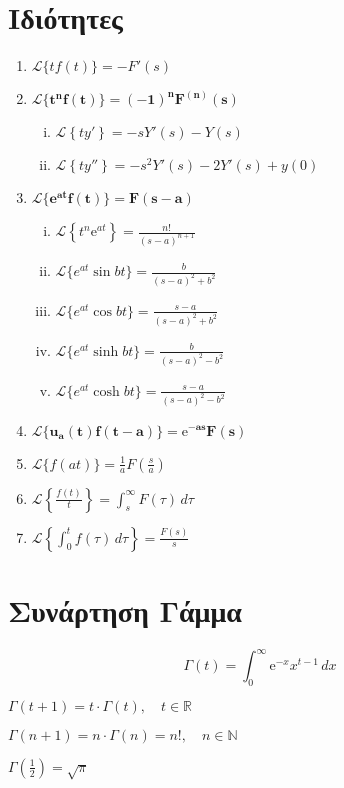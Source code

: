 {  \section*{Ιδιότητες}
  \begin{enumerate}
    \item $ \mathcal{L}\{tf(t)\} = -F'(s) $
    \item $ \bm{\mathcal{L}\{t^{n}f(t)\} = (-1)^{n} F^{(n)}(s)} $
      \begin{enumerate}[i)]
        \item $ \mathcal{L}\left\{ty'\right\} = -sY'(s)-Y(s) $ 
        \item $ \mathcal{L}\left\{ty''\right\} = -s^{2}Y'(s)-2Y'(s)+y(0) $ 
      \end{enumerate}
    \item $ \bm{\mathcal{L}\{e^{at}f(t)\} = F(s-a)}$
      \begin{enumerate}[i)]
        \item $ \mathcal{L}\left\{t^{n} \mathrm{e}^{at}\right\}=\frac{n!}{(s-a)^{n+1}} $
        \item $ \mathcal{L}\{e^{at} \sin{bt}\} = \frac{b}{(s-a)^{2}+b^{2}}$
        \item $ \mathcal{L}\{e^{at} \cos{bt}\} = \frac{s-a}{(s-a)^{2}+b^{2}}$
        \item $ \mathcal{L}\{e^{at} \sinh{bt}\} = \frac{b}{(s-a)^{2}-b^{2}}$
        \item $ \mathcal{L}\{e^{at} \cosh{bt}\} = \frac{s-a}{(s-a)^{2}-b^{2}}$
      \end{enumerate}
    \item $ \bm{\mathcal{L}\{u_{a}(t)f(t-a)\} = \mathrm{e}^{-as}F(s)}$
    \item $ \mathcal{L}\{f(at)\} = \frac{1}{a} F\left(\frac{s}{a}\right) $
    \item $ \mathcal{L}\left\{\frac{f(t)}{t} \right\} = \int\nolimits _{s}^{\infty} 
      F(\tau) \,{d\tau} $
    \item $ \mathcal{L}\left\{\int\nolimits _{0}^{t} f(\tau) \,{d\tau}\right\} = 
      \frac{F(s)}{s} $
  \end{enumerate}
  \section*{Συνάρτηση Γάμμα}
  \[
    \boxed{\Gamma (t) = \int _{0}^{\infty} \mathrm{e}^{-x} x^{t-1} \,{dx}}
  \] 
  \begin{myitemize}
    \item $\Gamma (t+1) = t \cdot \Gamma (t), \quad t \in \mathbb{R} $
    \item $\Gamma (n+1) = n \cdot \Gamma (n) = n!, \quad n \in \mathbb{N}$
    \item $\Gamma \left(\frac{1}{2}\right) = \sqrt{\pi}$
  \end{myitemize}
}

